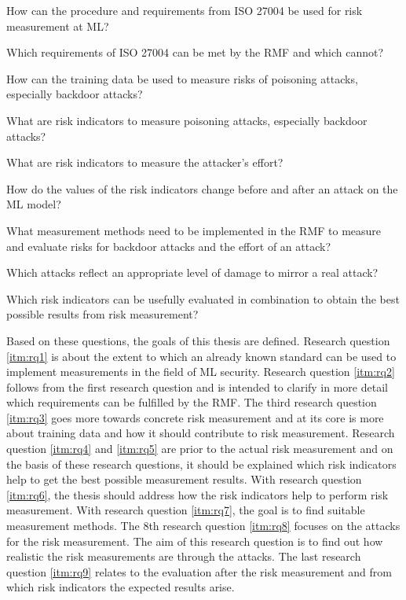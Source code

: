 \begin{questions}
  \item How can the procedure and requirements from ISO 27004 be used for risk measurement at ML? \label{itm:rq1}
  \item Which requirements of ISO 27004 can be met by the RMF and which cannot? \label{itm:rq2}
  \item How can the training data be used to measure risks of poisoning attacks, especially backdoor attacks? \label{itm:rq3}
  \item What are risk indicators to measure poisoning attacks, especially backdoor attacks? \label{itm:rq4}
  \item What are risk indicators to measure the attacker's effort? \label{itm:rq5}
  \item How do the values of the risk indicators change before and after an attack on the ML model? \label{itm:rq6}
  \item What measurement methods need to be implemented in the RMF to measure and evaluate risks for backdoor attacks and the effort of an attack? \label{itm:rq7}
  \item Which attacks reflect an appropriate level of damage to mirror a real attack? \label{itm:rq8}
  \item Which risk indicators can be usefully evaluated in combination to obtain the best possible results from risk measurement? \label{itm:rq9}
\end{questions}

Based on these questions, the goals of this thesis are defined. Research question \ref{itm:rq1} is about the extent to which an already known standard can be used to implement measurements in the field of ML security. Research question \ref{itm:rq2} follows from the first research question and is intended to clarify in more detail which requirements can be fulfilled by the RMF. The third research question \ref{itm:rq3} goes more towards concrete risk measurement and at its core is more about training data and how it should contribute to risk measurement. Research question \ref{itm:rq4} and \ref{itm:rq5} are prior to the actual risk measurement and on the basis of these research questions, it should be explained which risk indicators help to get the best possible measurement results. With research question \ref{itm:rq6}, the thesis should address how the risk indicators help to perform risk measurement. With research question \ref{itm:rq7}, the goal is to find suitable measurement methods. The 8th research question \ref{itm:rq8} focuses on the attacks for the risk measurement. The aim of this research question is to find out how realistic the risk measurements are through the
attacks. The last research question \ref{itm:rq9} relates to the evaluation after the risk measurement and from which risk indicators the expected results arise.

